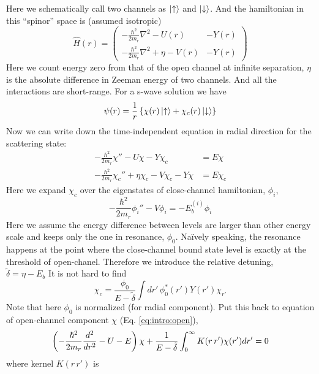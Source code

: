 Here we schematically call two channels as $\left|\uparrow\right>$ and $\left|\downarrow\right>$.  And the hamiltonian in this ``spinor'' space is (assumed isotropic)
\begin{equation}
\hat{H}(r)=
\begin{pmatrix}
-\frac{\hbar^{2}}{2m_{r}}\nabla^{2}-U(r)&-Y(r)\\
-\frac{\hbar^{2}}{2m_{r}}\nabla^{2}+\eta-V(r)&-Y(r)
\end{pmatrix}
\end{equation}
Here we count energy zero from that of the open channel at infinite separation, $\eta$ is the absolute difference in Zeeman energy of two channels.  And all the interactions are short-range.  For a s-wave solution we have 
\begin{equation}
\psi(r)=\frac{1}{r}\left\{\chi(r)\left|\uparrow\right>+\chi_{c}(r)\left|\downarrow\right>\right\}
\end{equation}
Now we can write down the time-independent \sch equation in radial direction for the scattering state:
\begin{align}
-\frac{\hbar^{2}}{2m_{r}}\chi''-U\chi-Y\chi_c&=E\chi\label{eq:intro:open}\\
-\frac{\hbar^{2}}{2m_{r}}\chi_c''+\eta\chi_c-V\chi_c-Y\chi&=E\chi_c
\end{align}
Here we expand $\chi_{c}$ over the eigenstates of close-channel hamiltonian, $\phi_{i}$, 
\begin{equation}
-\frac{\hbar^{2}}{2m_{r}}\phi_{i}''-V \phi_{i}=-E_{b}^{(i)}\phi_{i}
\end{equation}
Here we assume the energy difference between levels are larger than other energy scale and keeps only the one in resonance, $\phi_{0}$.  Na\"{i}vely speaking, the resonance happens at the point where the close-channel bound state level is exactly at the threshold of open-chanel.  Therefore we introduce the relative detuning, $\tilde\delta=\eta-E_{b}$ It is not hard to find
\begin{equation}
\chi_{c}=\frac{\phi_{0}}{E-\tilde\delta}\int{dr'}\,\phi_{0}^{*}(r')Y(r')\chi_{r'}
\end{equation}
Note that here $\phi_{0}$ is normalized (for radial component).  Put this back to \sch equation of open-channel component $\chi$ (Eq. \ref{eq:intro:open}), 
\begin{equation}\label{eq:intro:chi}
\left(-\frac{\hbar^{2}}{2m_{r}}\frac{d^{2}}{dr^{2}}-U-E\right)\chi+\frac{1}{E-\tilde\delta}\int_{0}^{\infty}K(r\,r')\chi(r')dr'=0
\end{equation}
where kernel $K(r\,r')$ is
